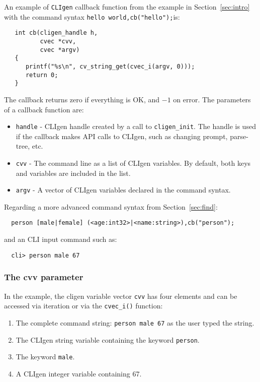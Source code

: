 \documentclass[a4paper, 10pt] {article}
\begin{document}
An example of {\tt CLIgen} callback function from the example in
Section~\ref{sec:intro} with the command syntax {\tt hello world,cb("hello");}is:

\begin{verbatim}
   int cb(cligen_handle h, 
          cvec *cvv, 
          cvec *argv)
   {
      printf("%s\n", cv_string_get(cvec_i(argv, 0)));
      return 0;
   }
\end{verbatim}
The callback returns zero if everything is OK, and $-1$ on error. The parameters of a callback function are:
\begin{itemize}
\item
{\tt handle} - CLIgen handle created by a call to {\tt cligen\_init}. The handle is used if the callback makes API calls to CLIgen, such as changing prompt, parse-tree, etc.
\item
{\tt cvv} - The command line as a list of CLIgen variables. By default, both keys and variables are included in the list.
\item
{\tt argv} - A vector of CLIgen variables declared in the command syntax.
\end{itemize}

Regarding a more advanced command syntax from Section~\ref{sec:find}:
\begin{verbatim}
  person [male|female] (<age:int32>|<name:string>),cb("person");
\end{verbatim}
and an CLI input command such as:
\begin{verbatim}
  cli> person male 67
\end{verbatim}

\subsubsection{The cvv parameter}

In the example, the cligen variable vector {\tt cvv} has four elements and can be accessed via iteration or via the {\tt cvec\_i()} function:
\begin{enumerate}
\item The complete command string: {\tt person male 67} as the user typed the string.
\item The CLIgen string variable containing the keyword {\tt person}.
\item The keyword {\tt male}.
\item A CLIgen integer variable containing 67.
\end{enumerate}
\end{document}
